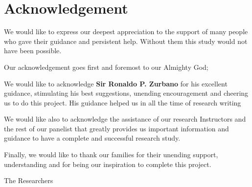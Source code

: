 \section*{\centering Acknowledgement}

We would like to express our deepest appreciation to the support of many people who gave their guidance and persistent help.
Without them this study would not have been possible.

Our acknowledgement goes first and foremost to our Almighty God;

We would like to acknowledge \textbf{Sir Ronaldo P. Zurbano} for his excellent guidance, stimulating his best suggestions, unending encouragement and cheering us to do this project.
His guidance helped us in all the time of research writing

We would like also to acknowledge the assistance of our research Instructors and the rest of our panelist that greatly provides us important information and guidance to have a complete and successful research study.

Finally, we would like to thank our families for their unending support, understanding and for being our inspiration to complete this project.

\vspace{4em}

\begin{flushright}
    The Researchers
\end{flushright}
